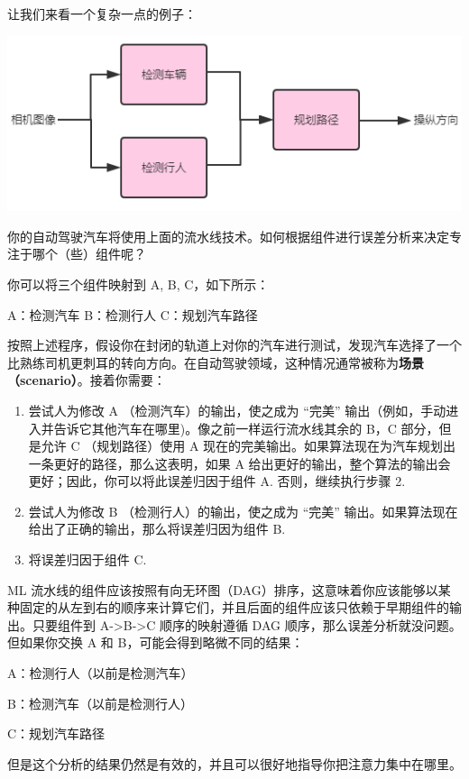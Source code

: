 让我们来看一个复杂一点的例子：

\includegraphics{./img/ch48_03.png}

你的自动驾驶汽车将使用上面的流水线技术。如何根据组件进行误差分析来决定专注于哪个（些）组件呢？

你可以将三个组件映射到 A, B, C，如下所示：

A：检测汽车 B：检测行人 C：规划汽车路径

按照上述程序，假设你在封闭的轨道上对你的汽车进行测试，发现汽车选择了一个比熟练司机更刺耳的转向方向。在自动驾驶领域，这种情况通常被称为\textbf{场景（scenario）}。接着你需要：

\begin{enumerate}
\def\labelenumi{\arabic{enumi}.}
\tightlist
\item
  尝试人为修改 A （检测汽车）的输出，使之成为 ``完美''
  输出（例如，手动进入并告诉它其他汽车在哪里)。像之前一样运行流水线其余的
  B，C 部分，但是允许 C （规划路径）使用 A
  现在的完美输出。如果算法现在为汽车规划出一条更好的路径，那么这表明，如果
  A 给出更好的输出，整个算法的输出会更好；因此，你可以将此误差归因于组件
  A. 否则，继续执行步骤 2.
\item
  尝试人为修改 B （检测行人）的输出，使之成为 ``完美''
  输出。如果算法现在给出了正确的输出，那么将误差归因为组件 B.
\item
  将误差归因于组件 C.
\end{enumerate}

ML
流水线的组件应该按照有向无环图（DAG）排序，这意味着你应该能够以某种固定的从左到右的顺序来计算它们，并且后面的组件应该只依赖于早期组件的输出。只要组件到
A-\textgreater B-\textgreater C 顺序的映射遵循 DAG
顺序，那么误差分析就没问题。但如果你交换 A 和
B，可能会得到略微不同的结果：

A：检测行人（以前是检测汽车）

B：检测汽车（以前是检测行人）

C：规划汽车路径

但是这个分析的结果仍然是有效的，并且可以很好地指导你把注意力集中在哪里。

